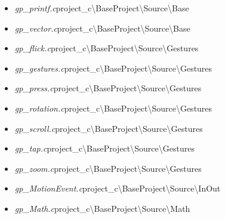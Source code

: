 \begin{itemize}
\item \textit{gp_printf.c}\quad project_c\textbackslash BaseProject\textbackslash Source\textbackslash Base
\item \textit{gp_vector.c}\quad project_c\textbackslash BaseProject\textbackslash Source\textbackslash Base
\item \textit{gp_flick.c}\quad project_c\textbackslash BaseProject\textbackslash Source\textbackslash Gestures
\item \textit{gp_gestures.c}\quad project_c\textbackslash BaseProject\textbackslash Source\textbackslash Gestures
\item \textit{gp_press.c}\quad project_c\textbackslash BaseProject\textbackslash Source\textbackslash Gestures
\item \textit{gp_rotation.c}\quad project_c\textbackslash BaseProject\textbackslash Source\textbackslash Gestures
\item \textit{gp_scroll.c}\quad project_c\textbackslash BaseProject\textbackslash Source\textbackslash Gestures
\item \textit{gp_tap.c}\quad project_c\textbackslash BaseProject\textbackslash Source\textbackslash Gestures
\item \textit{gp_zoom.c}\quad project_c\textbackslash BaseProject\textbackslash Source\textbackslash Gestures
\item \textit{gp_MotionEvent.c}\quad project_c\textbackslash BaseProject\textbackslash Source\textbackslash InOut
\item \textit{gp_Math.c}\quad project_c\textbackslash BaseProject\textbackslash Source\textbackslash Math
\end{itemize}
